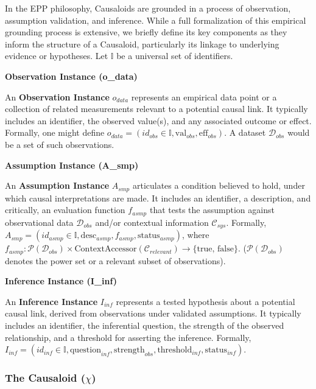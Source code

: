 In the EPP philosophy, Causaloids are grounded in a process of observation, assumption validation, and inference. While a full formalization of this empirical grounding process is extensive, we briefly define its key components as they inform the structure of a Causaloid, particularly its linkage to underlying evidence or hypotheses. Let \(\mathbb{I}\) be a universal set of identifiers.


\textbf{Observation Instance (o\_data)}

An \textbf{Observation Instance} \(o_{data}\) represents an empirical data point or a collection of related measurements relevant to a potential causal link. It typically includes an identifier, the observed value(s), and any associated outcome or effect. Formally, one might define \(o_{data} = (id_{obs} \in \mathbb{I}, \text{val}_{obs}, \text{eff}_{obs})\). A dataset \(\mathcal{D}_{obs}\) would be a set of such observations.

\textbf{Assumption Instance (A\_smp)}

An \textbf{Assumption Instance} \(A_{smp}\) articulates a condition believed to hold, under which causal interpretations are made. It includes an identifier, a description, and critically, an evaluation function \(f_{asmp}\) that tests the assumption against observational data \(\mathcal{D}_{obs}\) and/or contextual information \(\mathcal{C}_{sys}\). Formally, \(A_{smp} = (id_{asmp} \in \mathbb{I}, \text{desc}_{asmp}, f_{asmp}, \text{status}_{asmp})\), where \(f_{asmp}: \mathcal{P}(\mathcal{D}_{obs}) \times \text{ContextAccessor}(\mathcal{C}_{relevant}) \to \{\text{true, false}\}\). (\(\mathcal{P}(\mathcal{D}_{obs})\) denotes the power set or a relevant subset of observations).


\textbf{Inference Instance (I\_inf)}

An \textbf{Inference Instance} \(I_{inf}\) represents a tested hypothesis about a potential causal link, derived from observations under validated assumptions. It typically includes an identifier, the inferential question, the strength of the observed relationship, and a threshold for asserting the inference. Formally, \(I_{inf} = (id_{inf} \in \mathbb{I}, \text{question}_{inf}, \text{strength}_{obs}, \text{threshold}_{inf}, \text{status}_{inf})\).

\subsubsection[The Causaloid (chi)]{The Causaloid (\(\chi\))}
\label{ssec:causaloid_formal}

